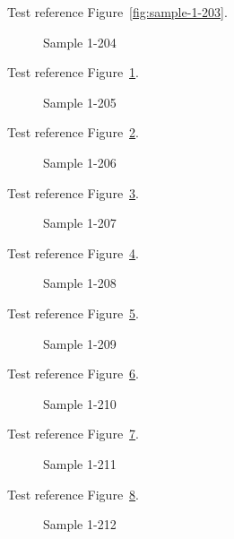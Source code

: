 Test reference Figure~\ref{fig:sample-1-203}.

\begin{figure}[tbhp]
\caption{Sample 1-204}
\label{fig:sample-1-204}
\end{figure}

Test reference Figure~\ref{fig:sample-1-204}.

\begin{figure}[tbhp]
\caption{Sample 1-205}
\label{fig:sample-1-205}
\end{figure}

Test reference Figure~\ref{fig:sample-1-205}.

\begin{figure}[tbhp]
\caption{Sample 1-206}
\label{fig:sample-1-206}
\end{figure}

Test reference Figure~\ref{fig:sample-1-206}.

\begin{figure}[tbhp]
\caption{Sample 1-207}
\label{fig:sample-1-207}
\end{figure}

Test reference Figure~\ref{fig:sample-1-207}.

\begin{figure}[tbhp]
\caption{Sample 1-208}
\label{fig:sample-1-208}
\end{figure}

Test reference Figure~\ref{fig:sample-1-208}.

\begin{figure}[tbhp]
\caption{Sample 1-209}
\label{fig:sample-1-209}
\end{figure}

Test reference Figure~\ref{fig:sample-1-209}.

\begin{figure}[tbhp]
\caption{Sample 1-210}
\label{fig:sample-1-210}
\end{figure}

Test reference Figure~\ref{fig:sample-1-210}.

\begin{figure}[tbhp]
\caption{Sample 1-211}
\label{fig:sample-1-211}
\end{figure}

Test reference Figure~\ref{fig:sample-1-211}.

\begin{figure}[tbhp]
\caption{Sample 1-212}
\label{fig:sample-1-212}
\end{figure}

